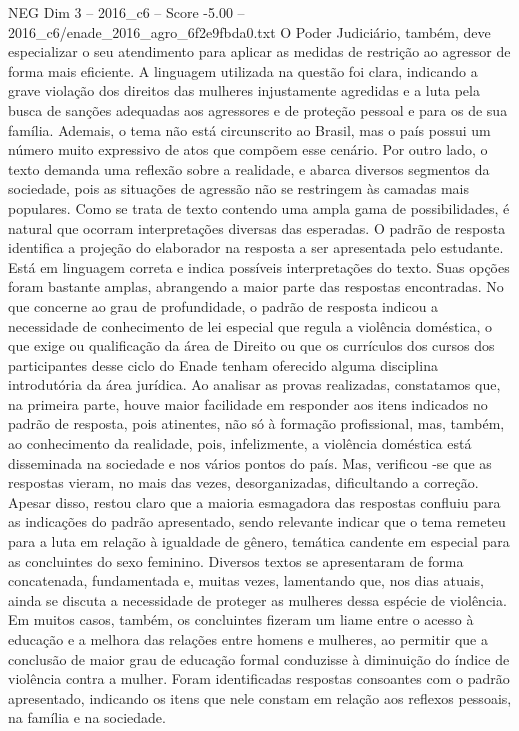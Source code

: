 \begin{textsample}{NEG Dim 3 – 2016\_c6 – Score -5.00 – 2016\_c6/enade\_2016\_agro\_6f2e9fbda0.txt}
O Poder Judiciário, também, deve especializar o seu atendimento para aplicar as medidas de restrição ao agressor de forma mais eficiente.
A linguagem utilizada na questão foi clara, indicando a grave violação dos direitos das mulheres injustamente agredidas e a luta pela busca de sanções adequadas aos agressores e de proteção pessoal e para os de sua família.
Ademais, o tema não está circunscrito ao Brasil, mas o país possui um número muito expressivo de atos que compõem esse cenário.
Por outro lado, o texto demanda uma reflexão sobre a realidade, e abarca diversos segmentos da sociedade, pois as situações de agressão não se restringem às camadas mais populares.
Como se trata de texto contendo uma ampla gama de possibilidades, é natural que ocorram interpretações diversas das esperadas.
O padrão de resposta identifica a projeção do elaborador na resposta a ser apresentada pelo estudante.
Está em linguagem correta e indica possíveis interpretações do texto.
Suas opções foram bastante amplas, abrangendo a maior parte das respostas encontradas.
No que concerne ao grau de profundidade, o padrão de resposta indicou a necessidade de conhecimento de lei especial que regula a violência doméstica, o que exige ou qualificação da área de Direito ou que os currículos dos cursos dos participantes desse ciclo do Enade tenham oferecido alguma disciplina introdutória da área jurídica.
Ao analisar as provas realizadas, constatamos que, na primeira parte, houve maior facilidade em responder aos itens indicados no padrão de resposta, pois atinentes, não só à formação profissional, mas, também, ao conhecimento da realidade, pois, infelizmente, a violência doméstica está disseminada na sociedade e nos vários pontos do país.
Mas, verificou -se que as respostas vieram, no mais das vezes, desorganizadas, dificultando a correção.
Apesar disso, restou claro que a maioria esmagadora das respostas confluiu para as indicações do padrão apresentado, sendo relevante indicar que o tema remeteu para a luta em relação à igualdade de gênero, temática candente em especial para as concluintes do sexo feminino.
Diversos textos se apresentaram de forma concatenada, fundamentada e, muitas vezes, lamentando que, nos dias atuais, ainda se discuta a necessidade de proteger as mulheres dessa espécie de violência.
Em muitos casos, também, os concluintes fizeram um liame entre o acesso à educação e a melhora das relações entre homens e mulheres, ao permitir que a conclusão de maior grau de educação formal conduzisse à diminuição do índice de violência contra a mulher.
Foram identificadas respostas consoantes com o padrão apresentado, indicando os itens que nele constam em relação aos reflexos pessoais, na família e na sociedade.

\end{textsample}
